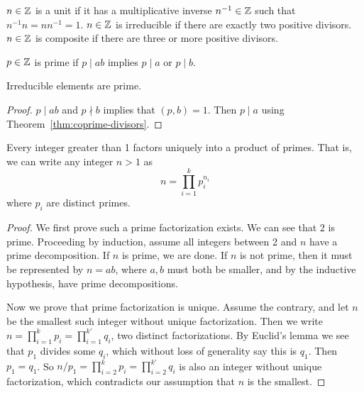 \begin{definition}
    \(n \in \mathbb{Z}\) is a unit if it has a multiplicative inverse \(n^{-1} \in \mathbb{Z}\)
    such that \(n^{-1}n = nn^{-1} = 1\).
    \(n \in \mathbb{Z}\) is irreducible if there are exactly two positive divisors.
    \(n \in \mathbb{Z}\) is composite if there are three or more positive divisors.
\end{definition}
\begin{definition}
    \(p \in \mathbb{Z}\) is prime if \(p \mid ab\) implies \(p \mid a\) or \(p \mid b\).
\end{definition}
\begin{theorem}\label{lem:euclid}
    Irreducible elements are prime.
\end{theorem}
\begin{proof}
    \(p \mid ab\) and \(p \nmid b\) implies that \((p,b) = 1\).
    Then \(p \mid a\) using Theorem~\ref{thm:coprime-divisors}.
\end{proof}

\begin{theorem}
    Every integer greater than 1 factors uniquely into a product of primes.
    That is, we can write any integer \(n > 1\) as
    \begin{equation*}
        n = \prod_{i=1}^k p_i^{n_i}
    \end{equation*}
    where \(p_i\) are distinct primes.
\end{theorem}
\begin{proof}
    We first prove such a prime factorization exists.
    We can see that 2 is prime.
    Proceeding by induction, assume all integers between 2 and \(n\)
    have a prime decomposition.
    If \(n\) is prime, we are done.
    If \(n\) is not prime,
    then it must be represented by \(n = ab\),
    where \(a,b\) must both be smaller,
    and by the inductive hypothesis,
    have prime decompositions.

    Now we prove that prime factorization is unique.
    Assume the contrary,
    and let \(n\) be the smallest such integer without unique factorization.
    Then we write \(n = \prod_{i=1}^k p_i = \prod_{i=1}^{k'} q_i\),
    two distinct factorizations.
    By Euclid's lemma we see that \(p_1\) divides some \(q_i\),
    which without loss of generality say this is \(q_1\).
    Then \(p_1 = q_1\).
    So \(n/p_1 = \prod_{i=2}^k p_i = \prod_{i=2}^{k'} q_i\)
    is also an integer without unique factorization,
    which contradicts our assumption that \(n\) is the smallest.
\end{proof}
